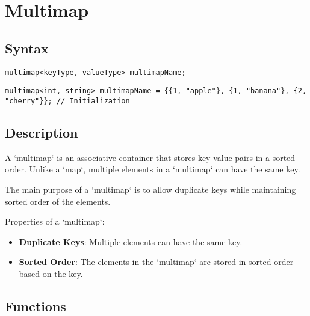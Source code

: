 \documentclass{article}
\begin{document}
\newpage
\section{Multimap}

\subsection{Syntax}

\begin{lstlisting}
multimap<keyType, valueType> multimapName;
\end{lstlisting}

\begin{lstlisting}
multimap<int, string> multimapName = {{1, "apple"}, {1, "banana"}, {2, "cherry"}}; // Initialization
\end{lstlisting}

\subsection{Description}

A `multimap` is an associative container that stores key-value pairs in a sorted order. Unlike a `map`, multiple elements in a `multimap` can have the same key.

\noindent The main purpose of a `multimap` is to allow duplicate keys while maintaining sorted order of the elements.

\noindent Properties of a `multimap`:
\begin{itemize}
    \item \textbf{Duplicate Keys}: Multiple elements can have the same key.
    \item \textbf{Sorted Order}: The elements in the `multimap` are stored in sorted order based on the key.
\end{itemize}

\subsection{Functions}
\end{document}
